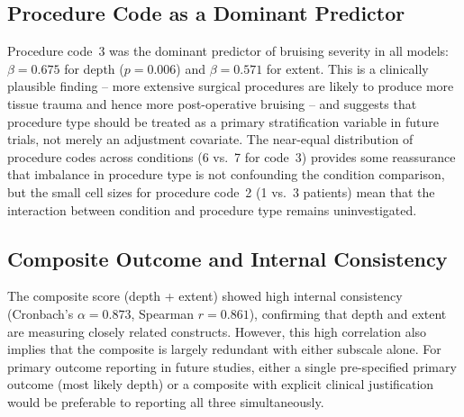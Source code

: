 \subsection{Procedure Code as a Dominant Predictor}

Procedure code~3 was the dominant predictor of bruising severity in all models: $\beta = 0.675$ for depth ($p = 0.006$) and $\beta = 0.571$ for extent. This is a clinically plausible finding -- more extensive surgical procedures are likely to produce more tissue trauma and hence more post-operative bruising -- and suggests that procedure type should be treated as a primary stratification variable in future trials, not merely an adjustment covariate. The near-equal distribution of procedure codes across conditions (6 vs.\ 7 for code~3) provides some reassurance that imbalance in procedure type is not confounding the condition comparison, but the small cell sizes for procedure code~2 (1 vs.\ 3 patients) mean that the interaction between condition and procedure type remains uninvestigated.

\subsection{Composite Outcome and Internal Consistency}

The composite score (depth + extent) showed high internal consistency (Cronbach's $\alpha = 0.873$, Spearman $r = 0.861$), confirming that depth and extent are measuring closely related constructs. However, this high correlation also implies that the composite is largely redundant with either subscale alone. For primary outcome reporting in future studies, either a single pre-specified primary outcome (most likely depth) or a composite with explicit clinical justification would be preferable to reporting all three simultaneously.


